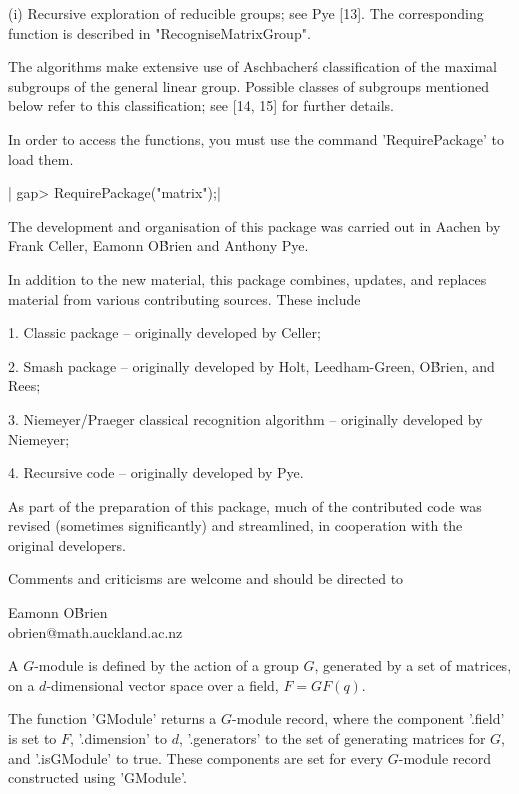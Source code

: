 (i) Recursive exploration of  reducible  groups;   see  Pye [13].     The
    corresponding function is described in "RecogniseMatrixGroup".

The algorithms make extensive use of  Aschbacher\'s classification of the
maximal   subgroups  of the general linear    group.  Possible classes of
subgroups mentioned below refer to  this classification; see [14, 15] for
further details.

In  order   to  access    the  functions,  you    must use   the  command
'RequirePackage' to load them.

|    gap> RequirePackage("matrix");|


The development and organisation of this package was carried out in Aachen
by Frank Celler, Eamonn O\'Brien and Anthony Pye.

In addition  to the new   material, this  package combines, updates,  and
replaces material from various contributing sources.  These include\:\

1. Classic package -- originally developed by Celler;

2. Smash  package   --  originally  developed   by   Holt, Leedham-Green,
   O\'Brien, and Rees;

3. Niemeyer/Praeger  classical   recognition   algorithm   --  originally
   developed by Niemeyer;

4. Recursive code -- originally developed by Pye.

As part of the preparation of this package,  much of the contributed code
was revised (sometimes  significantly)  and  streamlined,  in cooperation
with the original developers.

Comments and criticisms are welcome and should be directed to\:\

Eamonn O\'Brien\\
obrien@math.auckland.ac.nz


A $G$-module is defined by the action of a  group $G$, generated by a set
of matrices, on a $d$-dimensional vector space over a field, $F = GF(q)$.

The  function 'GModule' returns  a $G$-module record, where the component
'.field' is set to $F$, '.dimension' to  $d$, '.generators' to the set of
generating matrices for $G$,  and '.isGModule' to true.  These components
are set for every $G$-module record constructed using 'GModule'.

